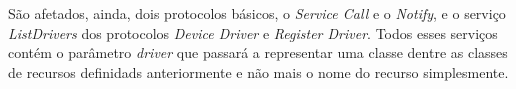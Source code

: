 São afetados, ainda, dois protocolos básicos, o \emph{Service Call} e o \emph{Notify}, e o serviço \emph{ListDrivers} dos protocolos \emph{Device Driver}  e \emph{Register Driver}. Todos esses serviços contém o parâmetro \emph{driver} que passará a representar uma classe dentre as classes de recursos definidads anteriormente e não mais o nome do recurso simplesmente.